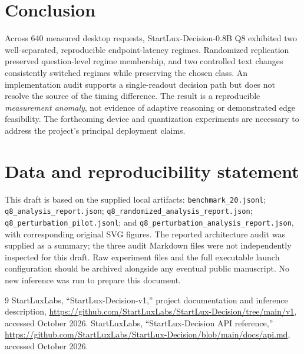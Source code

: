 \documentclass[10pt,twocolumn]{article}
\begin{document}
\section{Conclusion}
Across 640 measured desktop requests, StartLux-Decision-0.8B Q8 exhibited two well-separated, reproducible endpoint-latency regimes. Randomized replication preserved question-level regime membership, and two controlled text changes consistently switched regimes while preserving the chosen class. An implementation audit supports a single-readout decision path but does not resolve the source of the timing difference. The result is a reproducible \emph{measurement anomaly}, not evidence of adaptive reasoning or demonstrated edge feasibility. The forthcoming device and quantization experiments are necessary to address the project's principal deployment claims.

\section*{Data and reproducibility statement}
This draft is based on the supplied local artifacts: \texttt{benchmark\_20.jsonl}; \texttt{q8\_analysis\_report.json}; \texttt{q8\_randomized\_analysis\_report.json}; \texttt{q8\_perturbation\_pilot.jsonl}; and \texttt{q8\_perturbation\_analysis\_report.json}, with corresponding original SVG figures. The reported architecture audit was supplied as a summary; the three audit Markdown files were not independently inspected for this draft. Raw experiment files and the full executable launch configuration should be archived alongside any eventual public manuscript. No new inference was run to prepare this document.

\begin{thebibliography}{9}\small
{} StartLuxLabs, ``StartLux-Decision-v1,'' project documentation and inference description, \url{https://github.com/StartLuxLabs/StartLux-Decision/tree/main/v1}, accessed October 2026.
 StartLuxLabs, ``StartLux-Decision API reference,'' \url{https://github.com/StartLuxLabs/StartLux-Decision/blob/main/docs/api.md}, accessed October 2026.
\end{thebibliography}
\end{document}
